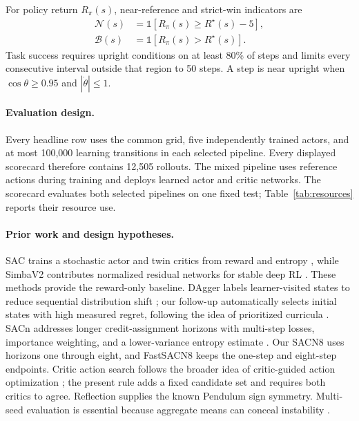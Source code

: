 For policy return $R_\pi(s)$, near-reference and strict-win indicators are
\[
\begin{aligned}
\mathcal N(s)&=\mathbb 1[R_\pi(s)\ge R^\star(s)-5],\\
\mathcal B(s)&=\mathbb 1[R_\pi(s)>R^\star(s)].
\end{aligned}
\]
Task success requires upright conditions on at least 80\% of steps and limits every consecutive interval outside that region to 50 steps. A step is near upright when $\cos\theta\ge0.95$ and $|\dot\theta|\le1$.

\paragraph{Evaluation design.}
Every headline row uses the common grid, five independently trained actors, and at most 100,000 learning transitions in each selected pipeline. Every displayed scorecard therefore contains 12,505 rollouts. The mixed pipeline uses reference actions during training and deploys learned actor and critic networks. The scorecard evaluates both selected pipelines on one fixed test; Table~\ref{tab:resources} reports their resource use.

 \paragraph{Prior work and design hypotheses.}
SAC trains a stochastic actor and twin critics from reward and entropy \cite{haarnoja2018sac}, while SimbaV2 contributes normalized residual networks for stable deep RL \cite{lee2025simba}. These methods provide the reward-only baseline. DAgger labels learner-visited states to reduce sequential distribution shift \cite{ross2011dagger}; our follow-up automatically selects initial states with high measured regret, following the idea of prioritized curricula \cite{jiang2021plr}. SACn addresses longer credit-assignment horizons with multi-step losses, importance weighting, and a lower-variance entropy estimate \cite{lyskawa2025sacn}. Our SACN8 uses horizons one through eight, and FastSACN8 keeps the one-step and eight-step endpoints. Critic action search follows the broader idea of critic-guided action optimization \cite{kalashnikov2018qtopt}; the present rule adds a fixed candidate set and requires both critics to agree. Reflection supplies the known Pendulum sign symmetry. Multi-seed evaluation is essential because aggregate means can conceal instability \cite{henderson2018matters,agarwal2021precipice}.

